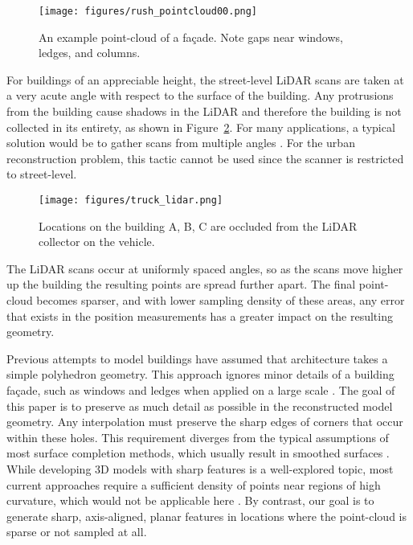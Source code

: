 \documentclass{article}
\begin{document}
\begin{figure}[t]

\begin{minipage}[b]{1.0\linewidth}
  \centering
  \centerline{\texttt{[image: figures/rush\_pointcloud00.png]}}
\end{minipage}

\caption{An example point-cloud of a fa\c{c}ade. Note gaps near windows, ledges, and columns.}
\label{fig:rush_points}

\end{figure}

For buildings of an appreciable height, the street-level LiDAR scans are taken at a very acute angle with respect to the surface of the building.  Any protrusions from the building cause shadows in the LiDAR and therefore the building is not collected in its entirety, as shown in Figure~\ref{fig:truck_lidar}.  For many applications, a typical solution would be to gather scans from multiple angles \cite{Tang10, Curless96}.  For the urban reconstruction problem, this tactic cannot be used since the scanner is restricted to street-level.

\begin{figure}[t]

\begin{minipage}[b]{1.0\linewidth}
  \centering
  \centerline{\texttt{[image: figures/truck\_lidar.png]}}
\end{minipage}

\caption{Locations on the building A, B, C are occluded from the LiDAR collector on the vehicle.}
\label{fig:truck_lidar}

\end{figure}

The LiDAR scans occur at uniformly spaced angles, so as the scans move higher up the building the resulting points are spread further apart. The final point-cloud becomes sparser, and with lower sampling density of these areas, any error that exists in the position measurements has a greater impact on the resulting geometry.

Previous attempts to model buildings have assumed that architecture takes a simple polyhedron geometry. This approach ignores minor details of a building fa\c{c}ade, such as windows and ledges when applied on a large scale \cite{Chauve10, Chen07}.  The goal of this paper is to preserve as much detail as possible in the reconstructed model geometry.  Any interpolation must preserve the sharp edges of corners that occur within these holes.  This requirement diverges from the typical assumptions of most surface completion methods, which usually result in smoothed surfaces \cite{Kazhdan06, Kawai11}.  While developing 3D models with sharp features is a well-explored topic, most current approaches require a sufficient density of points near regions of high curvature, which would not be applicable here \cite{Bernardini04, Mhatre06}.  By contrast, our goal is to generate sharp, axis-aligned, planar features in locations where the point-cloud is sparse or not sampled at all.
\end{document}
